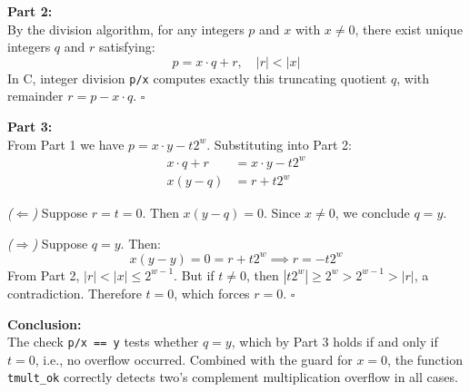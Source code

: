 \documentclass{article}
\begin{document}
\begin{flushleft}
\bigskip
\textbf{Part 2:}\\
By the division algorithm, for any integers $p$ and $x$ with $x \neq 0$, there exist unique
integers $q$ and $r$ satisfying:
\begin{equation}
    p = x \cdot q + r, \quad |r| < |x|
\end{equation}
In C, integer division \texttt{p/x} computes exactly this truncating quotient $q$,
with remainder $r = p - x \cdot q$. \hfill$\square$

\bigskip
\textbf{Part 3:}\\
From Part 1 we have $p = x \cdot y - t2^w$. Substituting into Part 2:
\begin{align}
    x \cdot q + r &= x \cdot y - t2^w \\
    x(y - q)      &= r + t2^w
\end{align}

\textit{($\Leftarrow$)} Suppose $r = t = 0$. Then $x(y - q) = 0$. Since $x \neq 0$, we conclude $q = y$.

\medskip
\textit{($\Rightarrow$)} Suppose $q = y$. Then:
\begin{equation}
    x(y - y) = 0 = r + t2^w \implies r = -t2^w
\end{equation}
From Part 2, $|r| < |x| \leq 2^{w-1}$. But if $t \neq 0$, then $|t2^w| \geq 2^w > 2^{w-1} > |r|$,
a contradiction. Therefore $t = 0$, which forces $r = 0$. \hfill$\square$

\bigskip
\textbf{Conclusion:}\\
The check \texttt{p/x == y} tests whether $q = y$, which by Part 3 holds if and only if
$t = 0$, i.e., no overflow occurred. Combined with the guard for $x = 0$, the function
\texttt{tmult\_ok} correctly detects two's complement multiplication overflow in all cases.

\end{flushleft}
\end{document}
